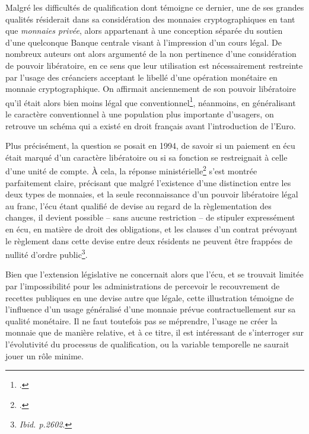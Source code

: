 { Malgré les difficultés de qualification dont témoigne ce dernier, une de ses grandes qualités résiderait dans sa considération des monnaies cryptographiques en tant que \emph{monnaies privée}, alors appartenant à une conception séparée du soutien d'une quelconque Banque centrale visant à l'impression d'un cours légal. De nombreux auteurs ont alors argumenté de la non pertinence d'une considération de pouvoir libératoire, en ce sens que leur utilisation est nécessairement restreinte par l'usage des créanciers acceptant le libellé d'une opération monétaire en monnaie cryptographique. On affirmait anciennement de son pouvoir libératoire qu'il était alors bien moins légal que conventionnel\footnote{.}, néanmoins, en généralisant le caractère conventionnel à une population plus importante d'usagers, on retrouve un schéma qui a existé en droit français avant l'introduction de l'Euro.\par 
 
 Plus précisément, la question se posait en 1994, de savoir si un paiement en écu était marqué d'un caractère libératoire ou si sa fonction se restreignait à celle d'une unité de compte. À cela, la réponse ministérielle\footnote{.} s'est montrée parfaitement claire, précisant que malgré l'existence d'une distinction entre les deux types de monnaies, et la seule reconnaissance d'un pouvoir libératoire légal au franc, l'écu étant qualifié de devise au regard de la règlementation des changes, \og il devient possible \---{} sans aucune restriction \---{}  de stipuler expressément en écu, en matière de droit des obligations, et les clauses d'un contrat prévoyant le règlement dans cette devise entre deux résidents ne peuvent être frappées de nullité d'ordre public\fg{}\footnote{\emph{Ibid. p.2602}.}.\par
 Bien que l'extension législative ne concernait alors que l'écu, et se trouvait limitée par l'impossibilité pour les administrations de percevoir le recouvrement de recettes publiques en une devise autre que légale, cette illustration témoigne de l'influence d'un usage généralisé d'une monnaie prévue contractuellement sur sa qualité monétaire. Il ne faut toutefois pas se méprendre, l'usage ne créer la monnaie que de manière relative, et à ce titre, il est intéressant de s'interroger sur l'évolutivité du processus de qualification, ou la variable temporelle ne saurait jouer un rôle minime.\par
  
}
